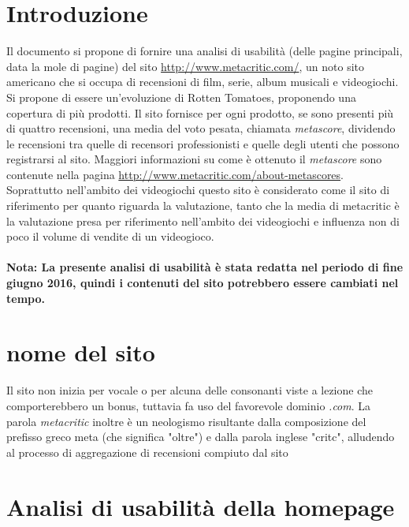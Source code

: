 \documentclass[12pt]{article}
\begin{document}
\newpage
\renewcommand{\contentsname}{Indice}
\tableofcontents

\newpage
{}

\section{Introduzione}
Il documento si propone di fornire una analisi di usabilità (delle pagine principali, data la mole di pagine) del sito \url{http://www.metacritic.com/}, un noto sito americano che si occupa di recensioni di film, serie, album musicali e videogiochi. Si propone di essere un'evoluzione di Rotten Tomatoes, proponendo una copertura di più prodotti. Il sito fornisce per ogni prodotto, se sono presenti più di quattro recensioni, una media del voto pesata, chiamata \textit{metascore}, dividendo le recensioni tra quelle di recensori professionisti e quelle degli utenti che possono registrarsi al sito. Maggiori informazioni su come è ottenuto il \textit{metascore} sono contenute nella pagina \url{http://www.metacritic.com/about-metascores}.\\
Soprattutto nell'ambito dei videogiochi questo sito è considerato come il sito di riferimento per quanto riguarda la valutazione, tanto che la media di metacritic è la valutazione presa per riferimento nell'ambito dei videogiochi e influenza non di poco il volume di vendite di un videogioco.
\\ \\ \textbf{Nota: La presente analisi di usabilità è stata redatta nel periodo di fine giugno 2016, quindi i contenuti del sito potrebbero essere cambiati nel tempo.}
\section{nome del sito}
Il sito non inizia per vocale o per alcuna delle consonanti viste a lezione che comporterebbero un bonus, tuttavia fa uso del favorevole dominio \textit{.com}. La parola \textit{metacritic} inoltre è un neologismo risultante dalla composizione del prefisso greco meta (che significa "oltre") e dalla parola inglese "critc", alludendo al processo di aggregazione di recensioni compiuto dal sito
\newpage
\section{Analisi di usabilità della homepage}
\end{document}
